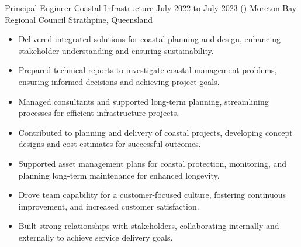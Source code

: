 	\entrytable%
	{Principal Engineer Coastal Infrastructure}
	{July 2022 to July 2023}
	{()}
	{Moreton Bay Regional Council}
	{Strathpine, Queensland}
	{\begin{itemize}
			\item Delivered integrated solutions for coastal planning and design, enhancing stakeholder understanding and ensuring sustainability.
			\item Prepared technical reports to investigate coastal management problems, ensuring informed decisions and achieving project goals.
			\item Managed consultants and supported long-term planning, streamlining processes for efficient infrastructure projects.
			\item Contributed to planning and delivery of coastal projects, developing concept designs and cost estimates for successful outcomes.
			\item Supported asset management plans for coastal protection, monitoring, and planning long-term maintenance for enhanced longevity.
			\item Drove team capability for a customer-focused culture, fostering continuous improvement, and increased customer satisfaction.
			\item Built strong relationships with stakeholders, collaborating internally and externally to achieve service delivery goals.
		\end{itemize}
	}


